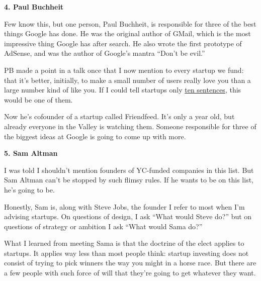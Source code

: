 \textbf{4. Paul Buchheit}

Few know this, but one person, Paul Buchheit, is responsible for three
of the best things Google has done. He was the original author of GMail,
which is the most impressive thing Google has after search. He also
wrote the first prototype of AdSense, and was the author of Google's
mantra ``Don't be evil.''

PB made a point in a talk once that I now mention to every startup we
fund: that it's better, initially, to make a small number of users
really love you than a large number kind of like you. If I could tell
startups only \href{13sentences.html}{ten sentences}, this would be one
of them.

Now he's cofounder of a startup called Friendfeed. It's only a year old,
but already everyone in the Valley is watching them. Someone responsible
for three of the biggest ideas at Google is going to come up with more.

\textbf{5. Sam Altman}

I was told I shouldn't mention founders of YC-funded companies in this
list. But Sam Altman can't be stopped by such flimsy rules. If he wants
to be on this list, he's going to be.

Honestly, Sam is, along with Steve Jobs, the founder I refer to most
when I'm advising startups. On questions of design, I ask ``What would
Steve do?'' but on questions of strategy or ambition I ask ``What would
Sama do?''

What I learned from meeting Sama is that the doctrine of the elect
applies to startups. It applies way less than most people think: startup
investing does not consist of trying to pick winners the way you might
in a horse race. But there are a few people with such force of will that
they're going to get whatever they want.
